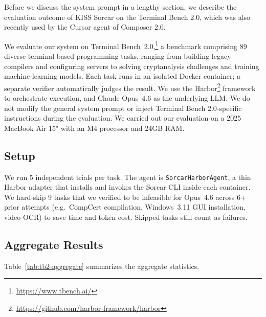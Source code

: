\documentclass{article}
\begin{document}
Before we discuss the system prompt in a lengthy section, we describe the evaluation outcome of KISS Sorcar on the Terminal Bench 2.0, which was also recently used by the Cursor agent of Composer 2.0.

We evaluate our system on Terminal Bench~2.0,\footnote{\url{https://www.tbench.ai/}} a benchmark comprising 89 diverse terminal-based programming tasks, ranging from building legacy compilers and configuring servers to solving cryptanalysis challenges and training machine-learning models.  Each task runs in an isolated Docker container; a separate verifier automatically judges the result.  We use the Harbor\footnote{\url{https://github.com/harbor-framework/harbor}} framework to orchestrate execution, and Claude Opus~4.6 as the underlying LLM.  We do not modify the general system prompt or inject Terminal Bench 2.0-specific instructions during the evaluation.  We carried out our evaluation on a 2025 MacBook Air 15" with an M4 processor and 24GB RAM.

\subsection{Setup}

We run 5 independent trials per task.  The agent is \texttt{SorcarHarborAgent}, a thin Harbor adapter that installs and invokes the Sorcar CLI inside each container.  We hard-skip 9 tasks that we verified to be infeasible for Opus~4.6 across 6+ prior attempts (e.g.\ CompCert compilation, Windows~3.11 GUI installation, video OCR) to save time and token cost.  Skipped tasks still count as failures.

\subsection{Aggregate Results}

Table~\ref{tab:tb2-aggregate} summarizes the aggregate statistics.
\end{document}
